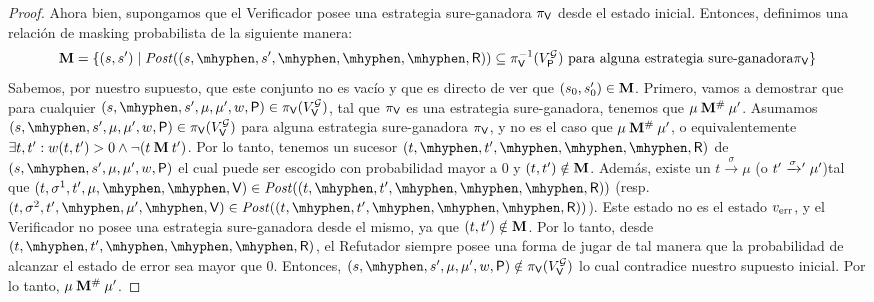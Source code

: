 \begin{proof}
Ahora bien,  supongamos que el Verificador posee una estrategia sure-ganadora $\pi_{\mathsf{V}}$
desde el estado inicial. Entonces, definimos una relación de masking probabilista de la siguiente manera: 
\[
\M =\{(s,s') \mid \post((s, \mhyphen, s', \mhyphen, \mhyphen, \mhyphen, \Refuter)) \subseteq \strat{\Verifier}^{-1}(V^{\StochG}_\Probabilistic) \text{ para alguna estrategia sure-ganadora} \strat{\Verifier} \}
\]
Sabemos, por nuestro supuesto, que este conjunto no es vacío y que es directo de ver que $(s_0,s'_0) \in \mathbin{\mathbf{M}}$. 
Primero, vamos a demostrar que para cualquier $(s, \mhyphen, s', \mu, \mu', w, \Probabilistic) \in \strat{\Verifier}(V^{\StochG}_\Verifier)$,  tal que   $\pi_{\mathsf{V}}$ es una estrategia sure-ganadora,  
tenemos que  $\mu \mathbin{\mathbf{M^{\#}}} \mu'$. 
Asumamos $(s, \mhyphen, s', \mu, \mu', w, \Probabilistic) \in \strat{\Verifier}(V^{\StochG}_\Verifier)$ para alguna estrategia sure-ganadora $\pi_{\mathsf{V}}$, y no es el caso que $\mu \mathbin{\mathbf{M^{\#}}} \mu'$, o equivalentemente 
$\exists t,t' : w(t,t') > 0 \wedge \neg (t \mathbin{\mathbf{M}} t')$. 
Por lo tanto, tenemos un sucesor $(t, \mhyphen,t', \mhyphen,\mhyphen,\mhyphen, \Refuter)$ de
$(s, \mhyphen, s', \mu, \mu', w, \Probabilistic)$ el cual puede ser escogido con probabilidad mayor a $0$ y  $(t,t') \notin \mathbin{\mathbf{M}}$. 
Además, existe un $t \xrightarrow{\sigma} \mu$ 
(o $t' \mathrel{{\xrightarrow[]{\sigma}}{}'} \mu'$)tal que $(t, \sigma^1, t', \mu, \mhyphen, \mhyphen, \Verifier) \in \post((t, \mhyphen,t', \mhyphen,\mhyphen,\mhyphen, \Refuter))$ 
(resp. $(t, \sigma^2, t', \mhyphen,  \mu', \mhyphen, \Verifier) \in \post((t, \mhyphen,t', \mhyphen,\mhyphen,\mhyphen, \Refuter))$). 
Este estado no es el estado $v_{\text{err}}$, y el Verificador no posee una estrategia sure-ganadora desde el mismo, ya que $(t,t') \notin \mathbin{\mathbf{M}}$.  Por lo tanto,  desde 
$(t, \mhyphen,t', \mhyphen,\mhyphen,\mhyphen, \Refuter)$, el Refutador siempre posee una forma de jugar de tal manera que la probabilidad de alcanzar el estado de error sea mayor que $0$.  Entonces, 
$(s, \mhyphen, s', \mu, \mu', w, \Probabilistic) \notin \strat{\Verifier}(V^{\StochG}_\Verifier)$ lo cual contradice nuestro supuesto inicial. 
Por lo tanto, $\mu \mathbin{\mathbf{M^{\#}}} \mu'$.


\end{proof}
